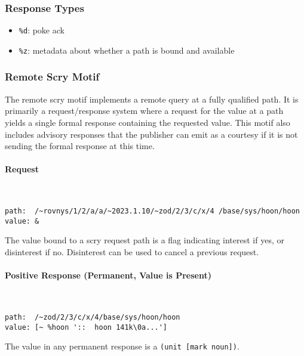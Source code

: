 \documentclass[twoside]{article}
\begin{document}
\subsubsection{Response Types}

\begin{itemize}
  \item  \lstinline[style=inlinecode]{%d}: poke ack
  \item  \lstinline[style=inlinecode]{%z}: metadata about whether a path is bound and available
\end{itemize}

\subsubsection{Remote Scry Motif}

The remote scry motif implements a remote query at a fully qualified path. It is primarily a request/response system where a request for the value at a path yields a single formal response containing the requested value. This motif also includes advisory responses that the publisher can emit as a courtesy if it is not sending the formal response at this time.

\paragraph{Request} \mbox{}\\

\begin{lstlisting}[style=listingcode]
path:  /~rovnys/1/2/a/a/~2023.1.10/~zod/2/3/c/x/4 /base/sys/hoon/hoon
value: &
\end{lstlisting}

The value bound to a scry request path is a flag indicating interest if yes, or disinterest if no. Disinterest can be used to cancel a previous request.

\paragraph{Positive Response (Permanent, Value is Present)} \mbox{}\\

\begin{lstlisting}[style=listingcode]
path:  /~zod/2/3/c/x/4/base/sys/hoon/hoon
value: [~ %hoon '::  hoon 141k\0a...']
\end{lstlisting}

The value in any permanent response is a \lstinline[style=inlinecode]{(unit [mark noun])}.
\end{document}
